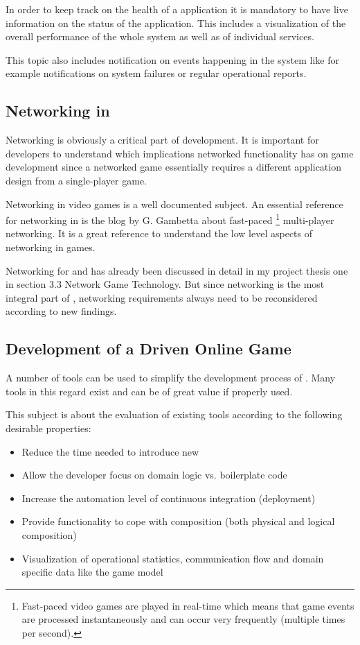 In order to keep track on the health of a \ms{} application it is mandatory to
have live information on the status of the application. This includes a
visualization of the overall performance of the whole system as well as of
individual services.

This topic also includes notification on events happening in the system like for
example notifications on system failures or regular operational reports. 

\subsection{Networking in \ogs{}}
\label{sub:networking_in_online_games}

Networking is obviously a critical part of \og{} development. It is important
for developers to understand which implications networked functionality has on
game development since a networked game essentially requires a different
application design from a single-player game. 

Networking in video games is a well documented subject. An essential reference
for networking in \ogs{} is the blog by G. Gambetta \cite{gambetta_fast_paced}
about fast-paced \footnote{Fast-paced video games are played in real-time which
means that game events are processed instantaneously and can occur very
frequently (multiple times per second).} multi-player networking.
It is a great reference to understand the low level aspects of networking in games.

Networking for \mss{} and \ogs{} has already been discussed in detail in my
project thesis one \cite{biedermann2015project1} in  section 3.3 Network Game
Technology. But since networking is the most integral part of \ogs{}, networking
requirements always need to be reconsidered according to new findings.


\subsection{Development of a \ms{} Driven Online Game}

A number of tools can be used to simplify the development process of \mss{}.
Many tools in this regard exist and can be of great value if properly used.

This subject is about the evaluation of existing tools according to the
following desirable properties:

\begin{itemize}
  \item Reduce the time needed to introduce new \mss{}
  \item Allow the developer focus on domain logic vs. boilerplate code
  \item Increase the automation level of continuous integration (deployment)
  \item Provide functionality to cope with \mss{} composition (both physical
  and logical composition)
  \item Visualization of operational statistics, communication flow and domain
  specific data like the game model
\end{itemize}

